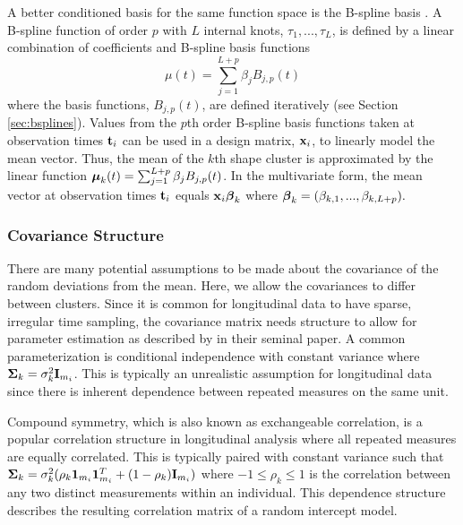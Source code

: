 A better conditioned basis for the same function space is the B-spline basis \cite{deboor1978, schumaker1981,curry1966, de1976}. A B-spline function of order $p$ with $L$ internal knots, $\tau_{1},...,\tau_{L}$, is defined by a linear combination of coefficients and B-spline basis functions
$$\mu(t) = \sum^{L+p}_{j=1} \beta_j B_{j,p}(t)$$
where the basis functions, $B_{j,p}(t)$, are defined iteratively \cite{deboor1972,cox1972}  (see Section \ref{sec:bsplines}). Values from the $p$th order B-spline basis functions taken at observation times $\mathbf t_{i}$ can be used in a design matrix, $\mathbf x_{i}$, to linearly model the mean vector. Thus, the mean of the $k$th shape cluster is approximated by the linear function $\boldsymbol\mu_{k}(t) = \sum^{L+p}_{j=1} \beta_j B_{j,p}(t)$. In the multivariate form, the mean vector at observation times $\mathbf t_{i}$ equals $\mathbf x_{i}\boldsymbol\beta_{k}$ where $\boldsymbol\beta_{k}=(\beta_{k,1},...,\beta_{k, L+p}).$  

\subsubsection{Covariance Structure}
There are many potential assumptions to be made about the covariance of the random deviations from the mean. Here, we allow the covariances to differ between clusters. Since it is common for longitudinal data to have sparse, irregular time sampling, the covariance matrix needs structure to allow for parameter estimation as described by \textcite{jennrich1986} in their seminal paper. A common parameterization is conditional independence with constant variance where $\mathbf \Sigma_{k}= \sigma_{k}^{2}\mathbf I_{m_{i}}$. This is typically an unrealistic assumption for longitudinal data since there is inherent dependence between repeated measures on the same unit. 

Compound symmetry, which is also known as exchangeable correlation, is a popular correlation structure in longitudinal analysis where all repeated measures are equally correlated. This is typically paired with constant variance such that $\mathbf \Sigma_{k} = \sigma_{k}^{2}(\rho_{k}\mathbf1_{m_{i}}\mathbf1_{m_{i}}^{T}+(1-\rho_{k})\mathbf I_{m_{i}})$ where $-1\leq\rho_{k}\leq 1$ is the correlation between any two distinct measurements within an individual. This dependence structure describes the resulting correlation matrix of a random intercept model.

